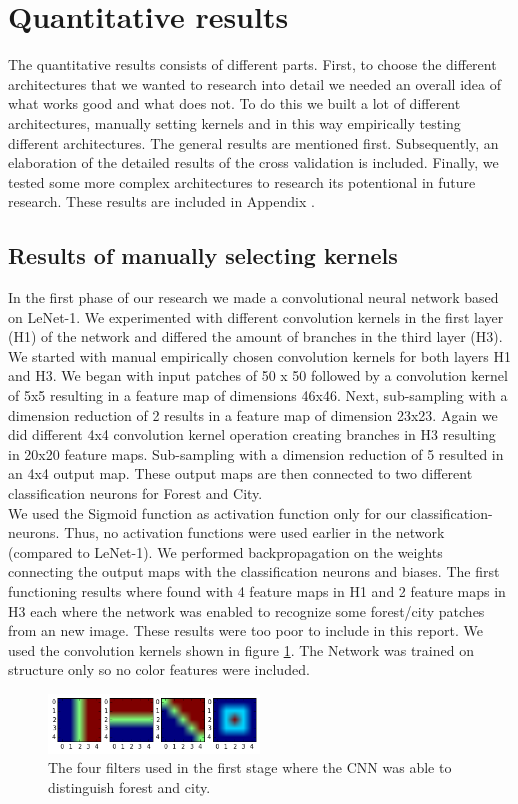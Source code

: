 \documentclass[a4paper,onecolumn]{report}
\begin{document}
\section{Quantitative results}
The quantitative results consists of different parts. First, to choose the different architectures that we wanted to research into detail we needed an overall idea of what works good and what does not. To do this we built a lot of different architectures, manually setting kernels and in this way empirically testing different architectures. The general results are mentioned first. Subsequently, an elaboration of the detailed results of the cross validation is included. Finally, we tested some more complex architectures to research its potentional in future research. These results are included in Appendix \label{app:DiffentArchitectures}.

\subsection{Results of manually selecting kernels}
In the first phase of our research we made a convolutional neural network based on LeNet-1. We experimented with different convolution kernels in the first layer (H1) of the network and differed the amount of branches in the third layer (H3). We started with manual empirically chosen convolution kernels for both layers H1 and H3. We began with input patches of 50 x 50 followed by a convolution kernel of 5x5 resulting in a feature map of dimensions 46x46. Next, sub-sampling with a dimension reduction of 2 results in a feature map of dimension 23x23. Again we did different 4x4 convolution kernel operation creating branches in H3 resulting in 20x20 feature maps. Sub-sampling with a dimension reduction of 5 resulted in an 4x4 output map. These output maps are then connected to two different classification neurons for Forest and City. \\

We used the Sigmoid function as activation function only for our classification-neurons. Thus, no activation functions were used earlier in the network (compared to LeNet-1). We performed backpropagation on the weights connecting the output maps with the classification neurons and biases. The first functioning results where found with 4 feature maps in H1 and 2 feature maps in H3 each where the network was enabled to recognize some forest/city patches from an new image. These results were too poor to include in this report. We used the convolution kernels shown in figure \ref{fig:firstFilters}. The Network was trained on structure only so no color features were included. 
\begin{figure}[h!]
	\centering
	\includegraphics[width=0.5\textwidth]{./images/firstFilters.png}
	\caption{The four filters used in the first stage where the CNN was able to distinguish forest and city.}
	\label{fig:firstFilters}
\end{figure} 
\end{document}
